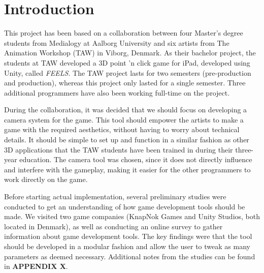 \section{Introduction}


This project has been based on a collaboration between four Master's degree students from Medialogy at Aalborg University and six artists from The Animation Workshop (TAW) in Viborg, Denmark. As their bachelor project, the students at TAW developed a 3D point 'n click game for iPad, developed using Unity, called \textit{FEELS}. The TAW project lasts for two semesters (pre-production and production), whereas this project only lasted for a single semester. Three additional programmers have also been working full-time on the project.

During the collaboration, it was decided that we should focus on developing a camera system for the game. This tool should empower the artists to make a game with the required aesthetics, without having to worry about technical details. It should be simple to set up and function in a similar fashion as other 3D applications that the TAW students have been trained in during their three-year education. The camera tool was chosen, since it does not directly influence and interfere with the gameplay, making it easier for the other programmers to work directly on the game.

Before starting actual implementation, several preliminary studies were conducted to get an understanding of how game development tools should be made. We visited two game companies (KnapNok Games and Unity Studios, both located in Denmark), as well as conducting an online survey to gather information about game development tools. The key findings were that the tool should be developed in a modular fashion and allow the user to tweak as many parameters as deemed necessary. Additional notes from the studies can be found in \textbf{APPENDIX X}.